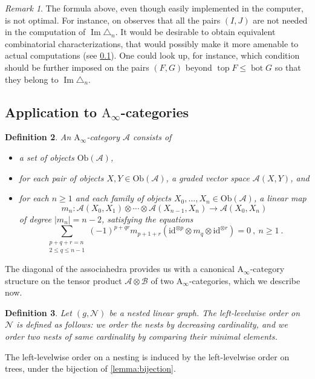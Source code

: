 \documentclass[twoside, 12pt]{amsart}
\newtheorem{definition}{Definition}[section]
\theoremstyle{remark}
\newtheorem{remark}[definition]{\sc Remark}
\DeclareMathOperator{\tp}{top}
\DeclareMathOperator{\bm}{bot}
\newcommand{\id}{\mathrm{id}}
\newcommand{\cat}[1]{\mathcal{#1}}
\DeclareMathOperator{\Ima}{Im} %
\begin{document}
\begin{remark}
The formula above, even though easily implemented in the computer, is not optimal. For instance, on observes that all the pairs $(I,J)$ are not needed in the computation of $\Ima \triangle_n$. It would be desirable to obtain equivalent combinatorial characterizations, that would possibly make it more amenable to actual computations (see \cref{sec:Ainftycat}). One could look up, for instance, which condition should be further imposed on the pairs $(F,G)$ beyond $\tp F\leq \bm G$ so that they belong to $\Ima \triangle_n$.
\end{remark}





\subsection{Application to $\mathrm{A}_\infty$-categories} 
\label{sec:Ainftycat}


\begin{definition} 
An $\mathrm{A}_\infty$-category $\cat{A}$ consists of 
\begin{itemize}
  \item a set of objects $\mathrm{Ob}(\cat{A})$,
  \item for each pair of objects $X,Y \in \mathrm{Ob}(\cat{A})$, a graded vector space $\cat{A}(X,Y)$, and
  \item for each $n\geq 1$ and each family of objects $X_0,\ldots,X_n \in \mathrm{Ob}(\cat{A})$, a linear map \[m_n : \cat{A}(X_0,X_1) \otimes \cdots \otimes \cat{A}(X_{n-1},X_n) \to \cat{A}(X_0,X_n)\] of degree $|m_n|=n-2$, satisfying the equations \[\sum_{\substack{p+q+r=n \\ 2 \leq q \leq n-1}} (-1)^{p+qr}m_{p+1+r}(\id^{\otimes p} \otimes m_q \otimes \id^{\otimes r}) = 0 \ , \ n\geq 1 \ .\]
\end{itemize}
\end{definition}



The diagonal of the associahedra provides us with a canonical 
$\mathrm{A}_\infty$-category structure on the tensor product $\cat{A}\otimes \cat{B}$ of two $\mathrm{A}_\infty$-categories, which we describe now. 

\begin{definition}
Let $(g,\mathcal{N})$ be a nested linear graph. The \emph{left-levelwise order} on $\mathcal{N}$ is defined as follows: we order the nests by decreasing cardinality, and we order two nests of same cardinality by comparing their minimal elements. 
\end{definition}
The left-levelwise order on a nesting is induced by the left-levelwise order on trees, under the bijection of \cref{lemma:bijection}.
\end{document}

